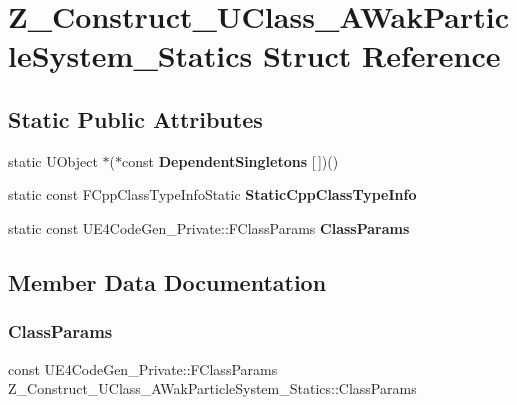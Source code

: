 \hypertarget{struct_z___construct___u_class___a_wak_particle_system___statics}{}\section{Z\+\_\+\+Construct\+\_\+\+U\+Class\+\_\+\+A\+Wak\+Particle\+System\+\_\+\+Statics Struct Reference}
\label{struct_z___construct___u_class___a_wak_particle_system___statics}
\subsection*{Static Public Attributes}
\begin{DoxyCompactItemize}
\item 
\mbox{\label{struct_z___construct___u_class___a_wak_particle_system___statics_a63e59db89a08cfc852e8914db6008642}} 
static U\+Object $\ast$($\ast$const {\bfseries Dependent\+Singletons} \mbox{[}$\,$\mbox{]})()
\item 
static const F\+Cpp\+Class\+Type\+Info\+Static {\bfseries Static\+Cpp\+Class\+Type\+Info}
\item 
static const U\+E4\+Code\+Gen\+\_\+\+Private\+::\+F\+Class\+Params {\bfseries Class\+Params}
\end{DoxyCompactItemize}


\subsection{Member Data Documentation}
\mbox{\label{struct_z___construct___u_class___a_wak_particle_system___statics_ae75742ee75fbe13fc8cfb51fa03db8ec}} 
\subsubsection{\texorpdfstring{ClassParams}{ClassParams}}
{\footnotesize\ttfamily const U\+E4\+Code\+Gen\+\_\+\+Private\+::\+F\+Class\+Params Z\+\_\+\+Construct\+\_\+\+U\+Class\+\_\+\+A\+Wak\+Particle\+System\+\_\+\+Statics\+::\+Class\+Params\hspace{0.3cm}{\ttfamily [static]}}

